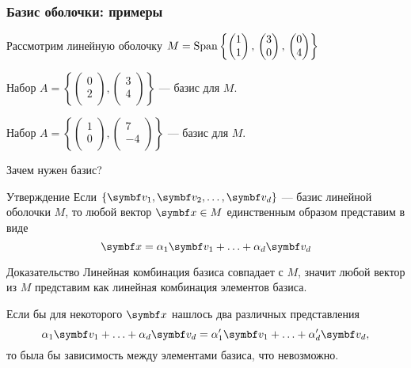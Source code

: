 \begin{frame}
\frametitle{Базис оболочки: примеры}

Рассмотрим линейную оболочку $M = \operatorname{Span}\left\{
\begin{pmatrix}
  1 \\
  1 \\
\end{pmatrix}, \, 
\begin{pmatrix}
  3 \\
  0 \\
\end{pmatrix},  \,
\begin{pmatrix}
  0 \\
  4 \\
\end{pmatrix}  
\right\}$

\pause

Набор $A = \left\{ \begin{pmatrix}
      0 \\
      2 \\
    \end{pmatrix}, \begin{pmatrix}
      3 \\
      4 \\
    \end{pmatrix} \right\}$ — базис для $M$.

\pause

Набор $A = \left\{ \begin{pmatrix}
  1 \\
  0 \\
\end{pmatrix}, \begin{pmatrix}
  7 \\
  -4 \\
\end{pmatrix} \right\}$ — базис для $M$.

\end{frame}



\begin{frame}{Зачем нужен базис?}

\begin{block}{Утверждение}
Если $\{\bv_1, \bv_2, \ldots, \bv_d\}$ — базис линейной оболочки $M$, 
то любой вектор $\bx\in M$ \alert{единственным} образом представим в виде 
\[
\bx  = \alpha_1 \bv_1 + \ldots + \alpha_d \bv_d
\]
\end{block}

\pause
\begin{block}{Доказательство}
Линейная комбинация базиса совпадает с $M$, значит любой вектор из $M$ представим
как линейная комбинация элементов базиса.
\pause

Если бы для некоторого $\bx$ нашлось два различных представления
\[
  \alpha_1 \bv_1 + \ldots + \alpha_d \bv_d = \alpha_1' \bv_1 + \ldots + \alpha_d' \bv_d,
\]
то была бы зависимость между элементами базиса, что невозможно. 
\end{block}

\end{frame}



